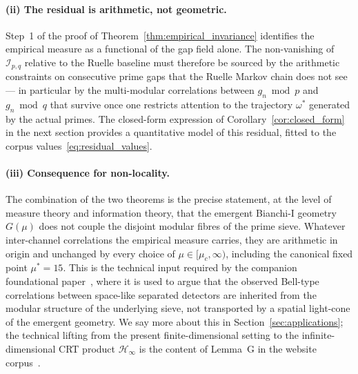 \paragraph{(ii) The residual is arithmetic, not geometric.}
Step~1 of the proof of Theorem~\ref{thm:empirical_invariance}
identifies the empirical measure as a functional of the gap field
alone. The non-vanishing of $\mathcal{I}_{p,q}$ relative to the
Ruelle baseline must therefore be sourced by the arithmetic
constraints on consecutive prime gaps that the Ruelle Markov chain
does not see --- in particular by the multi-modular correlations
between $g_n \bmod p$ and $g_n \bmod q$ that survive once one
restricts attention to the trajectory $\omega^\ast$ generated by the
actual primes. The closed-form expression of
Corollary~\ref{cor:closed_form} in the next section provides a
quantitative model of this residual, fitted to the corpus
values~\eqref{eq:residual_values}.

\paragraph{(iii) Consequence for non-locality.}
The combination of the two theorems is the precise statement, at the
level of measure theory and information theory, that the emergent
Bianchi-I geometry $G(\mu)$ does not couple the disjoint modular
fibres of the prime sieve. Whatever inter-channel correlations the
empirical measure carries, they are arithmetic in origin and
unchanged by every choice of $\mu \in [\mu_c, \infty)$, including the
canonical fixed point $\mu^\ast = 15$. This is the technical input
required by the companion foundational
paper~\cite{PT_HOLONOMY_NONLOCALITY}, where it is used to argue that
the observed Bell-type correlations between space-like separated
detectors are inherited from the modular structure of the underlying
sieve, not transported by a spatial light-cone of the emergent
geometry. We say more about this in Section~\ref{sec:applications};
the technical lifting from the present finite-dimensional setting to
the infinite-dimensional CRT product $\mathcal{H}_\infty$ is the
content of Lemma~G in the
website corpus~\cite[Lemma G]{PT_Monograph}.
